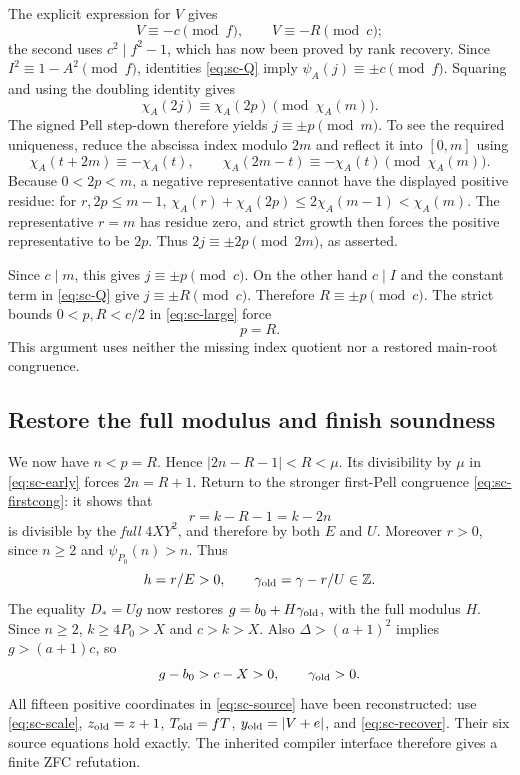 The explicit expression for $V$ gives
\[
 V\equiv-c\pmod f,\qquad V\equiv-R\pmod c;
\]
the second uses $c^2\mid f^2-1$, which has now been proved by rank
recovery.  Since $I^2\equiv1-A^2\pmod f$, identities
\eqref{eq:sc-Q} imply $\psi_A(j)\equiv\pm c\pmod f$.
Squaring and using the doubling identity gives
\[
 \chi_A(2j)\equiv\chi_A(2p)\pmod{\chi_A(m)}.
\]
The signed Pell step-down therefore yields $j\equiv\pm p\pmod m$.
To see the required uniqueness, reduce the abscissa index modulo $2m$
and reflect it into $[0,m]$ using
\[
 \chi_A(t+2m)\equiv-\chi_A(t),\qquad
 \chi_A(2m-t)\equiv-\chi_A(t)\pmod{\chi_A(m)}.
\]
Because $0<2p<m$, a negative representative cannot have the displayed
positive residue: for $r,2p\le m-1$,
$\chi_A(r)+\chi_A(2p)\le2\chi_A(m-1)<\chi_A(m)$.
The representative $r=m$ has residue zero, and strict growth then forces
the positive representative to be $2p$.  Thus
$2j\equiv\pm2p\pmod{2m}$, as asserted.

Since $c\mid m$, this gives $j\equiv\pm p\pmod c$.
On the other hand $c\mid I$ and the constant term in
\eqref{eq:sc-Q} give $j\equiv\pm R\pmod c$.
Therefore $R\equiv\pm p\pmod c$.  The strict bounds
$0<p,R<c/2$ in \eqref{eq:sc-large} force
\begin{equation}\label{eq:sc-pR}
 p=R.
\end{equation}
This argument uses neither the missing index quotient nor a restored
main-root congruence.

\subsection{Restore the full modulus and finish soundness}

We now have $n<p=R$.  Hence
$|2n-R-1|<R<\mu$.  Its divisibility by $\mu$ in
\eqref{eq:sc-early} forces $2n=R+1$.
Return to the stronger first-Pell congruence
\eqref{eq:sc-firstcong}: it shows that
\[
 r=k-R-1=k-2n
\]
is divisible by the \emph{full} $4XY^2$, and therefore by both $E$ and
$U$.  Moreover $r>0$, since $n\ge2$ and $\psi_{P_0}(n)>n$.
Thus
\begin{equation}\label{eq:sc-recover}
 h=r/E>0,\qquad \gamma_{\rm old}=\gamma-r/U\in\mathbb Z.
\end{equation}
The equality $D_*=Ug$ now restores
$g=b_0+H\gamma_{\rm old}$, with the full modulus $H$.
Since $n\ge2$, $k\ge4P_0>X$ and $c>k>X$.
Also $\Delta>(a+1)^2$ implies $g>(a+1)c$, so
\[
 g-b_0>c-X>0,\qquad \gamma_{\rm old}>0.
\]
All fifteen positive coordinates in \eqref{eq:sc-source} have been
reconstructed: use \eqref{eq:sc-scale}, $z_{\rm old}=z+1$,
$T_{\rm old}=fT$, $y_{\rm old}=|V+e|$, and
\eqref{eq:sc-recover}.  Their six source equations hold exactly.
The inherited compiler interface therefore gives a finite ZFC refutation.

